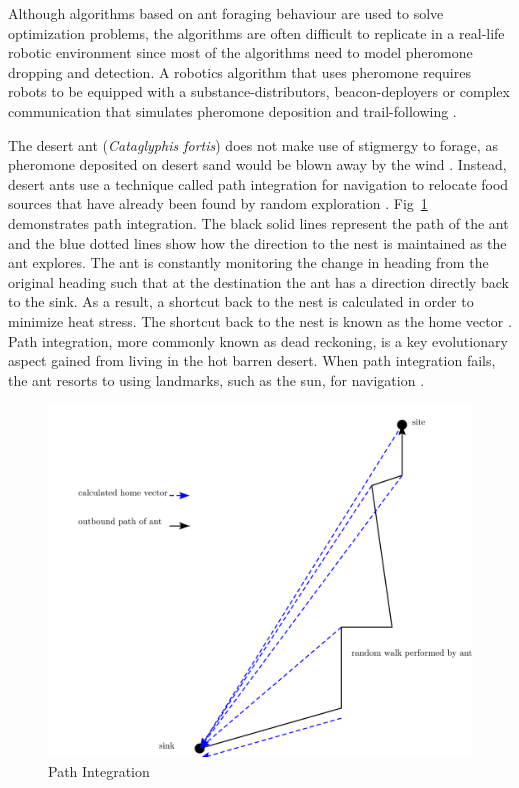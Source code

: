 Although algorithms based on ant foraging behaviour are used to solve optimization problems, the algorithms are often difficult to replicate in a real-life robotic environment since most of the algorithms need to model pheromone dropping and detection. A robotics algorithm that uses pheromone requires robots to be equipped with a substance-distributors, beacon-deployers or complex communication that simulates pheromone deposition and trail-following \cite{hoff2010two}.

The desert ant (\textit{Cataglyphis fortis}) does not make use of stigmergy to forage, as pheromone deposited on desert sand would be blown away by the wind \cite{collett1992visual}. Instead, desert ants use a technique called path integration for navigation to relocate food sources that have already been found by random exploration \cite{collett1998local,wehner2003desert}. Fig~\ref{pathintegration} demonstrates path integration. The black solid lines represent the path of the ant and the blue dotted lines show how the direction to the nest is maintained as the ant explores. The ant is constantly monitoring the change in heading from the original heading such that at the destination the ant has a direction directly back to the sink. As a result, a shortcut back to the nest is calculated in order to minimize heat stress. The shortcut back to the nest is known as the home vector \cite{muller1988path}. Path integration, more commonly known as dead reckoning, is a key evolutionary aspect gained from living in the hot barren desert. When path integration fails, the ant resorts to using landmarks, such as the sun, for navigation \cite{collett1998local}.

\begin{figure} [h]
	\centering
	\includegraphics[width=\textwidth]{chapters/chapter2/figures/drawing.png}
	\caption{Path Integration }
	\label{pathintegration}
\end{figure}

